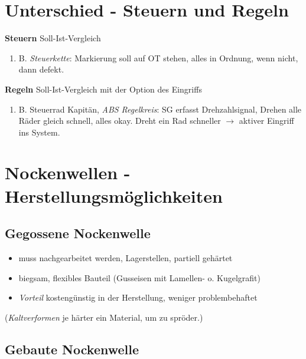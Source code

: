 \section{Unterschied - Steuern und
Regeln}\label{unterschied-steuern-und-regeln}

\textbf{Steuern} Soll-Ist-Vergleich

\begin{enumerate}
\def\labelenumi{\alph{enumi}.}
\setcounter{enumi}{25}
\item
  B. \emph{Steuerkette}: Markierung soll auf OT stehen, alles in
  Ordnung, wenn nicht, dann defekt.
\end{enumerate}

\textbf{Regeln} Soll-Ist-Vergleich mit der Option des Eingriffs

\begin{enumerate}
\def\labelenumi{\alph{enumi}.}
\setcounter{enumi}{25}
\item
  B. Steuerrad Kapitän, \emph{ABS Regelkreis}: SG erfasst
  Drehzahlsignal, Drehen alle Räder gleich schnell, alles okay. Dreht
  ein Rad schneller $\to$ aktiver Eingriff ins System.
\end{enumerate}

\section{Nockenwellen -
Herstellungsmöglichkeiten}\label{nockenwellen-herstellungsmoeglichkeiten}

\subsection{Gegossene Nockenwelle}\label{gegossene-nockenwelle}

\begin{itemize}
\item
  muss nachgearbeitet werden, Lagerstellen, partiell gehärtet
\item
  biegsam, flexibles Bauteil (Gusseisen mit Lamellen- o. Kugelgrafit)
\item
  \emph{Vorteil} kostengünstig in der Herstellung, weniger
  problembehaftet
\end{itemize}

(\emph{Kaltverformen} je härter ein Material, um zu spröder.)

\subsection{Gebaute Nockenwelle}\label{gebaute-nockenwelle}

